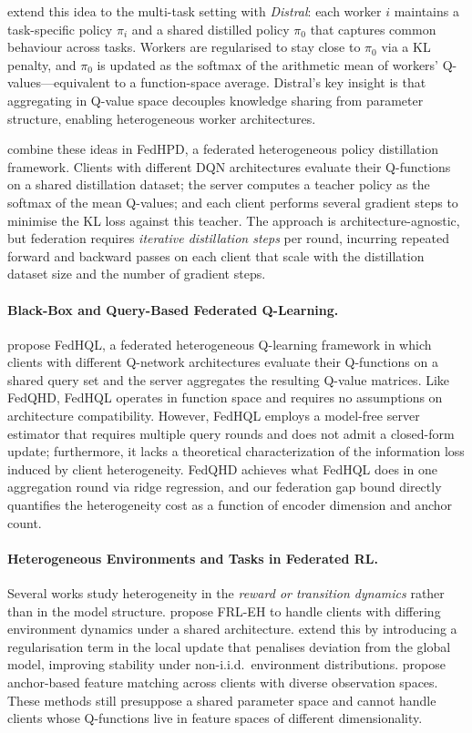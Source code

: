 \citet{teh2017distral} extend this idea to the multi-task setting with \emph{Distral}: each worker $i$ maintains a task-specific policy $\pi_i$ and a shared distilled policy $\pi_0$ that captures common behaviour across tasks.
Workers are regularised to stay close to $\pi_0$ via a KL penalty, and $\pi_0$ is updated as the softmax of the arithmetic mean of workers' Q-values---equivalent to a function-space average.
Distral's key insight is that aggregating in Q-value space decouples knowledge sharing from parameter structure, enabling heterogeneous worker architectures.

\citet{shen2023fedhpd} combine these ideas in FedHPD, a federated heterogeneous policy distillation framework.
Clients with different DQN architectures evaluate their Q-functions on a shared distillation dataset; the server computes a teacher policy as the softmax of the mean Q-values; and each client performs several gradient steps to minimise the KL loss against this teacher.
The approach is architecture-agnostic, but federation requires \emph{iterative distillation steps} per round, incurring repeated forward and backward passes on each client that scale with the distillation dataset size and the number of gradient steps.

\paragraph{Black-Box and Query-Based Federated Q-Learning.}
\citet{fan2023fedhql} propose FedHQL, a federated heterogeneous Q-learning framework in which clients with different Q-network architectures evaluate their Q-functions on a shared query set and the server aggregates the resulting Q-value matrices.
Like FedQHD, FedHQL operates in function space and requires no assumptions on architecture compatibility.
However, FedHQL employs a model-free server estimator that requires multiple query rounds and does not admit a closed-form update; furthermore, it lacks a theoretical characterization of the information loss induced by client heterogeneity.
FedQHD achieves what FedHQL does in one aggregation round via ridge regression, and our federation gap bound directly quantifies the heterogeneity cost as a function of encoder dimension and anchor count.

\paragraph{Heterogeneous Environments and Tasks in Federated RL.}
Several works study heterogeneity in the \emph{reward or transition dynamics} rather than in the model structure.
\citet{jin2022federated} propose FRL-EH to handle clients with differing environment dynamics under a shared architecture.
\citet{hwang2025fed} extend this by introducing a regularisation term in the local update that penalises deviation from the global model, improving stability under non-i.i.d.\ environment distributions.
\citet{ye2023fedfm} propose anchor-based feature matching across clients with diverse observation spaces.
These methods still presuppose a shared parameter space and cannot handle clients whose Q-functions live in feature spaces of different dimensionality.

